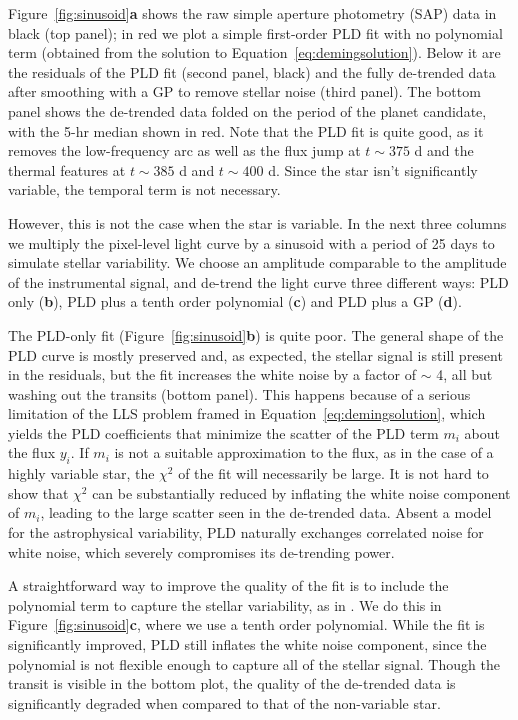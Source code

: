 \documentclass[]{emulateapj}
\begin{document}
Figure~\ref{fig:sinusoid}\textbf{a} shows the raw simple aperture photometry (SAP) data in black (top
panel); in red we plot a simple first-order PLD fit with no polynomial term (obtained
from the solution to Equation~\ref{eq:demingsolution}). Below it are 
the residuals of the PLD fit (second panel, black) and the fully de-trended data after 
smoothing with a GP to remove stellar noise (third panel). The bottom panel shows 
the de-trended data folded on the period of the planet candidate, with the 5-hr 
median shown in red. Note that the PLD fit is quite good, as it removes the
low-frequency arc as well as the flux jump at $t \sim 375$ d and the thermal 
features at $t \sim 385$ d and $t \sim 400$ d. Since the star
isn't significantly variable, the temporal term is not necessary.

However, this is not the case when the star is variable. In the next three columns 
we multiply the pixel-level light curve by a sinusoid 
with a period of 25 days to simulate stellar variability. We choose an amplitude 
comparable to the amplitude of the instrumental signal, and de-trend the light 
curve three different ways: PLD only (\textbf{b}), PLD plus a tenth order 
polynomial (\textbf{c}) and PLD plus a GP (\textbf{d}).

The PLD-only fit (Figure~\ref{fig:sinusoid}\textbf{b}) is quite poor. The general shape of the PLD
curve is mostly preserved and, as expected, the stellar signal is still present 
in the residuals, but the fit increases the white noise by a factor of $\sim$ 4,
all but washing out the transits (bottom panel). This happens because of a
serious limitation of the LLS problem framed in Equation~\ref{eq:demingsolution}, 
which yields the PLD coefficients that minimize the scatter of the PLD term $m_i$ 
about the flux $y_i$. If $m_i$ is not a suitable approximation to the flux, as in the case
of a highly variable star, the $\chi^2$ of the fit will necessarily be large.
It is not hard to show that $\chi^2$ can be substantially reduced
by inflating the white noise component of $m_i$, leading to the large scatter
seen in the de-trended data. Absent a model for the astrophysical variability,
PLD naturally exchanges correlated noise for white noise, which severely
compromises its de-trending power. 

A straightforward way to improve the quality of the fit is to include the polynomial
term to capture the stellar variability, as in \cite{DEM15}. We do this in Figure~\ref{fig:sinusoid}\textbf{c}, 
where we use a tenth order polynomial. While the fit is significantly
improved, PLD still inflates the white noise component, since the polynomial is 
not flexible enough to capture all of the stellar signal. Though the transit is
visible in the bottom plot, the quality of the de-trended data is significantly
degraded when compared to that of the non-variable star.
\end{document}
